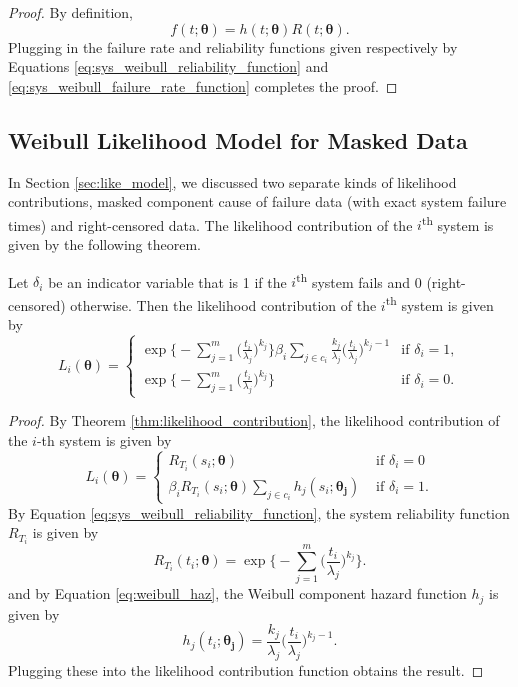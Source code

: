 \documentclass[
]{article}
\begin{document}
\begin{proof}
By definition,
$$
f(t;\boldsymbol{\theta}) = h(t;\boldsymbol{\theta}) R(t;\boldsymbol{\theta}).
$$
Plugging in the failure rate and reliability functions given respectively by
Equations \eqref{eq:sys_weibull_reliability_function} and
\eqref{eq:sys_weibull_failure_rate_function} completes the proof.
\end{proof}

\hypertarget{weibull-likelihood-model-for-masked-data}{%
\subsection{Weibull Likelihood Model for Masked
Data}\label{weibull-likelihood-model-for-masked-data}}

In Section \ref{sec:like_model}, we discussed two separate kinds of
likelihood contributions, masked component cause of failure data (with
exact system failure times) and right-censored data. The likelihood
contribution of the \(i\)\textsuperscript{th} system is given by the
following theorem.

\begin{theorem}
Let $\delta_i$ be an indicator variable that is 1 if the
$i$\textsuperscript{th} system fails and 0 (right-censored) otherwise.
Then the likelihood contribution of the $i$\textsuperscript{th} system is given by
\begin{equation}
\label{eq:weibull_likelihood_contribution}
L_i(\boldsymbol{\theta}) =
\begin{cases}
    \exp\biggl\{-\sum_{j=1}^{m}\bigl(\frac{t_i}{\lambda_j}\bigr)^{k_j}\biggr\}
        \beta_i \sum_{j \in c_i} \frac{k_j}{\lambda_j}\bigl(\frac{t_i}{\lambda_j}\bigr)^{k_j-1}
    & \text{if } \delta_i = 1,\\
    \exp\bigl\{-\sum_{j=1}^{m}\bigl(\frac{t_i}{\lambda_j}\bigr)^{k_j}\biggr\} & \text{if } \delta_i = 0.
\end{cases}
\end{equation}
\end{theorem}
\begin{proof}
By Theorem \ref{thm:likelihood_contribution}, the likelihood contribution of the
$i$-th system is given by
$$
L_i(\boldsymbol{\theta}) =
\begin{cases}
    R_{T_i}(s_i;\boldsymbol{\theta})                      &\text{ if } \delta_i = 0\\
    \beta_i R_{T_i}(s_i;\boldsymbol{\theta})
        \sum_{j\in c_i} h_j(s_i;\boldsymbol{\theta_j})   &\text{ if } \delta_i = 1.
\end{cases}
$$
By Equation \eqref{eq:sys_weibull_reliability_function}, the system reliability
function $R_{T_i}$ is given by
$$
R_{T_i}(t_i;\boldsymbol{\theta}) = \exp\biggl\{-\sum_{j=1}^{m}\biggl(\frac{t_i}{\lambda_j}\biggr)^{k_j}\biggr\}.
$$
and by Equation \eqref{eq:weibull_haz}, the Weibull component hazard function $h_j$ is
given by
$$
h_j(t_i;\boldsymbol{\theta_j}) = \frac{k_j}{\lambda_j}\biggl(\frac{t_i}{\lambda_j}\biggr)^{k_j-1}.
$$
Plugging these into the likelihood contribution function obtains the result.
\end{proof}
\end{document}
